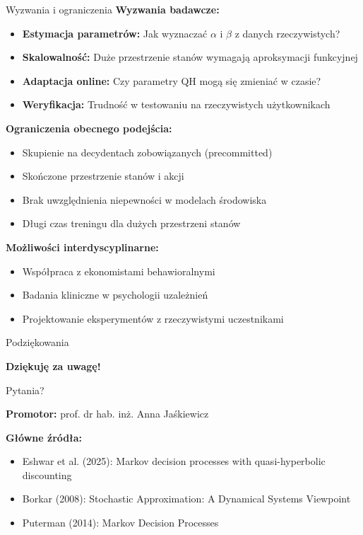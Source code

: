 \begin{frame}{Wyzwania i ograniczenia}
\textbf{Wyzwania badawcze:}
\begin{itemize}
    \item \textbf{Estymacja parametrów:} Jak wyznaczać $\alpha$ i $\beta$ z danych rzeczywistych?
    \item \textbf{Skalowalność:} Duże przestrzenie stanów wymagają aproksymacji funkcyjnej
    \item \textbf{Adaptacja online:} Czy parametry QH mogą się zmieniać w czasie?
    \item \textbf{Weryfikacja:} Trudność w testowaniu na rzeczywistych użytkownikach
\end{itemize}

\vspace{0.5em}
\textbf{Ograniczenia obecnego podejścia:}
\begin{itemize}
    \item Skupienie na decydentach zobowiązanych (precommitted)
    \item Skończone przestrzenie stanów i akcji
    \item Brak uwzględnienia niepewności w modelach środowiska
    \item Długi czas treningu dla dużych przestrzeni stanów
\end{itemize}

\vspace{0.5em}
\textbf{Możliwości interdyscyplinarne:}
\begin{itemize}
    \item Współpraca z ekonomistami behawioralnymi
    \item Badania kliniczne w psychologii uzależnień
    \item Projektowanie eksperymentów z rzeczywistymi uczestnikami
\end{itemize}
\end{frame}

\begin{frame}{Podziękowania}
\begin{center}
{\Large \textbf{Dziękuję za uwagę!}}

\vspace{1em}

Pytania?

\vspace{2em}

\textbf{Promotor:} prof. dr hab. inż. Anna Jaśkiewicz

\vspace{0.5em}

\textbf{Główne źródła:}
\begin{itemize}
    \item Eshwar et al. (2025): Markov decision processes with quasi-hyperbolic discounting
    \item Borkar (2008): Stochastic Approximation: A Dynamical Systems Viewpoint
    \item Puterman (2014): Markov Decision Processes
\end{itemize}
\end{center}
\end{frame}

